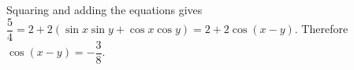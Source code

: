 Squaring and adding the equations gives $\dfrac{5}{4}=2+2(\sin x\sin y+\cos x\cos y)=2+2\cos(x-y)$. Therefore $\boxed{\cos(x-y)=-\dfrac{3}{8}}$.
